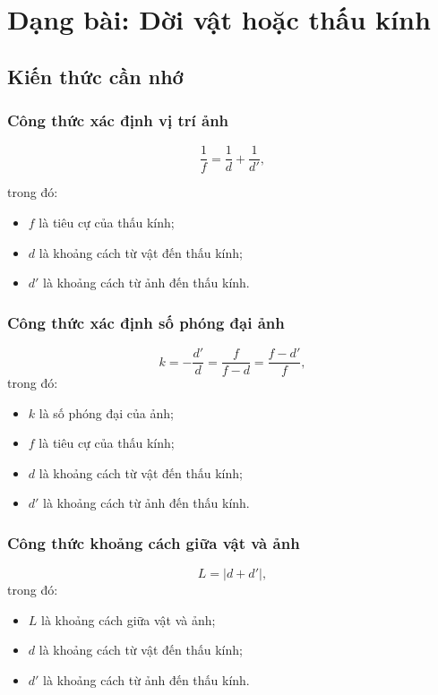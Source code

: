 \chapter{Dạng bài: Dời vật hoặc thấu kính}
\section{Kiến thức cần nhớ}
	
\subsection{Công thức xác định vị trí ảnh}
\begin{equation}
\dfrac{1}{f}=\dfrac{1}{d}+\dfrac{1}{d'},
\end{equation}

trong đó:
\begin{itemize}
	\item $f$ là tiêu cự của thấu kính;
	\item $d$ là khoảng cách từ vật đến thấu kính;
	\item $d'$ là khoảng cách từ ảnh đến thấu kính. 
\end{itemize}
\subsection{Công thức xác định số phóng đại ảnh}
\begin{equation}
k=-\dfrac{d'}{d}=\dfrac{f}{f-d}=\dfrac{f-d'}{f},
\end{equation}
trong đó:
\begin{itemize}
	\item $k$ là số phóng đại của ảnh;
	\item $f$ là tiêu cự của thấu kính;
	\item $d$ là khoảng cách từ vật đến thấu kính;
	\item $d'$ là khoảng cách từ ảnh đến thấu kính. 
\end{itemize}

\subsection{Công thức khoảng cách giữa vật và ảnh}
\begin{equation}
L=\left|d+d' \right| ,
\end{equation}
trong đó:
\begin{itemize}
	\item $L$ là khoảng cách giữa vật và ảnh;
	\item $d$ là khoảng cách từ vật đến thấu kính;
	\item $d'$ là khoảng cách từ ảnh đến thấu kính. 
\end{itemize}
	
